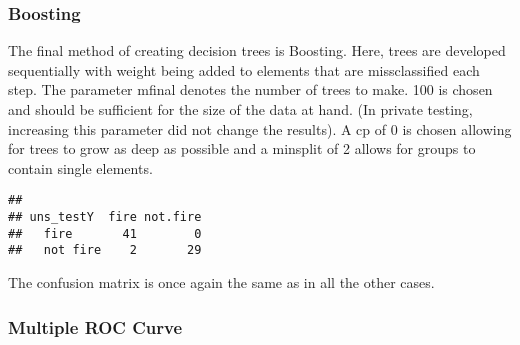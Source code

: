 \documentclass[
]{article}
\newenvironment{Shaded}{\begin{snugshade}}{\end{snugshade}}
\newcommand{\AttributeTok}[1]{\textcolor[rgb]{0.13,0.29,0.53}{#1}}
\newcommand{\CommentTok}[1]{\textcolor[rgb]{0.56,0.35,0.01}{\textit{#1}}}
\newcommand{\ConstantTok}[1]{\textcolor[rgb]{0.56,0.35,0.01}{#1}}
\newcommand{\DecValTok}[1]{\textcolor[rgb]{0.00,0.00,0.81}{#1}}
\newcommand{\FunctionTok}[1]{\textcolor[rgb]{0.13,0.29,0.53}{\textbf{#1}}}
\newcommand{\NormalTok}[1]{#1}
\newcommand{\OtherTok}[1]{\textcolor[rgb]{0.56,0.35,0.01}{#1}}
\newcommand{\SpecialCharTok}[1]{\textcolor[rgb]{0.81,0.36,0.00}{\textbf{#1}}}
\begin{document}
\subsubsection{Boosting}\label{boosting}

The final method of creating decision trees is Boosting. Here, trees are
developed sequentially with weight being added to elements that are
missclassified each step. The parameter mfinal denotes the number of
trees to make. 100 is chosen and should be sufficient for the size of
the data at hand. (In private testing, increasing this parameter did not
change the results). A cp of 0 is chosen allowing for trees to grow as
deep as possible and a minsplit of 2 allows for groups to contain single
elements.

\begin{Shaded}
\end{Shaded}

\begin{verbatim}
##           
## uns_testY  fire not.fire
##   fire       41        0
##   not fire    2       29
\end{verbatim}

The confusion matrix is once again the same as in all the other cases.

\subsubsection{Multiple ROC Curve}\label{multiple-roc-curve-7}
\end{document}
